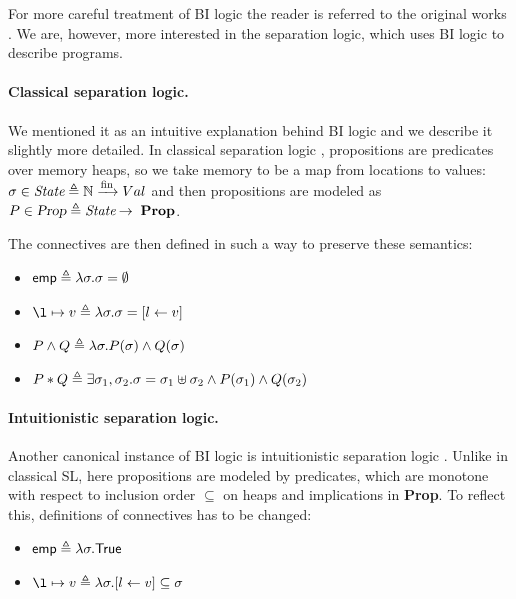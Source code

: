 For more careful treatment of BI logic the reader is referred to the original works \cite{ohearnLogicBunchedImplications1999, pymSemanticsProofTheory2002a}.
We are, however, more interested in the separation logic, which uses BI logic to describe programs.

\paragraph{Classical separation logic.}
We mentioned it as an intuitive explanation behind BI logic and we describe it slightly more detailed.
In classical separation logic \cite{ohearnLocalReasoningPrograms2001, reynoldsSeparationLogicLogic2002}, propositions are predicates over memory heaps, so we take memory to be a map from locations to values: \(\sigma \in \textit{State} \triangleq \mathbb{N} \xrightarrow[]{\text{fin}} Val\) and then propositions are modeled as \(P \in \textsl{Prop} \triangleq \textit{State} \mathbin{\rightarrow}~ \textbf{Prop}\).

The connectives are then defined in such a way to preserve these semantics:
\begin{itemize}
\item \(\textsf{emp} \triangleq \lambda \sigma. \sigma = \emptyset\)
\item \(\l \mapsto v \delequal \lambda \sigma. \sigma = [l \leftarrow v]\)
\item \(P \wedge Q \triangleq \lambda \sigma. P (\sigma) \wedge Q (\sigma)\)
\item \(P \ast Q \triangleq \exists \sigma_1, \sigma_2. \sigma = \sigma_1 \uplus \sigma_2 \wedge P(\sigma_1) \wedge Q(\sigma_2)\)
\end{itemize}

\paragraph{Intuitionistic separation logic.}
Another canonical instance of BI logic is intuitionistic separation logic \cite{reynoldsIntuitionisticReasoningShared2000}.
Unlike in classical SL, here propositions are modeled by predicates, which are monotone with respect to inclusion order \(\subseteq\) on heaps and implications in \textbf{Prop}.
To reflect this, definitions of connectives has to be changed:
\begin{itemize}
\item \(\textsf{emp} \triangleq \lambda \sigma. \textsf{True} \)
\item \(\l \mapsto v \delequal \lambda \sigma. [l \leftarrow v] \subseteq \sigma \)
\end{itemize}

